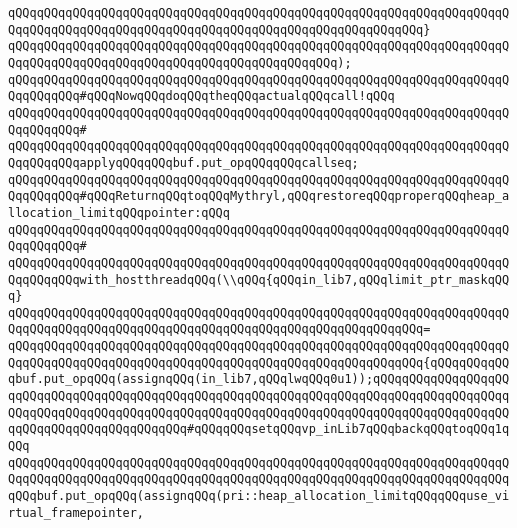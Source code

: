 \verb|qQQqqQQqqQQqqQQqqQQqqQQqqQQqqQQqqQQqqQQqqQQqqQQqqQQqqQQqqQQqqQQqqQQqqQQqqQQqqQQqqQQqqQQqqQQqqQQqqQQqqQQqqQQqqQQqqQQqqQQqqQQqqQQq}|\newline
\verb|qQQqqQQqqQQqqQQqqQQqqQQqqQQqqQQqqQQqqQQqqQQqqQQqqQQqqQQqqQQqqQQqqQQqqQQqqQQqqQQqqQQqqQQqqQQqqQQqqQQqqQQqqQQqqQQqqQQq);|\newline
\newline
\newline
\verb|qQQqqQQqqQQqqQQqqQQqqQQqqQQqqQQqqQQqqQQqqQQqqQQqqQQqqQQqqQQqqQQqqQQqqQQqqQQqqQQq#qQQqNowqQQqdoqQQqtheqQQqactualqQQqcall!qQQq|\newline
\verb|qQQqqQQqqQQqqQQqqQQqqQQqqQQqqQQqqQQqqQQqqQQqqQQqqQQqqQQqqQQqqQQqqQQqqQQqqQQqqQQq#|\newline
\verb|qQQqqQQqqQQqqQQqqQQqqQQqqQQqqQQqqQQqqQQqqQQqqQQqqQQqqQQqqQQqqQQqqQQqqQQqqQQqqQQqapplyqQQqqQQqbuf.put_opqQQqqQQqcallseq;|\newline
\newline
\newline
\verb|qQQqqQQqqQQqqQQqqQQqqQQqqQQqqQQqqQQqqQQqqQQqqQQqqQQqqQQqqQQqqQQqqQQqqQQqqQQqqQQq#qQQqReturnqQQqtoqQQqMythryl,qQQqrestoreqQQqproperqQQqheap_allocation_limitqQQqpointer:qQQq|\newline
\verb|qQQqqQQqqQQqqQQqqQQqqQQqqQQqqQQqqQQqqQQqqQQqqQQqqQQqqQQqqQQqqQQqqQQqqQQqqQQqqQQq#|\newline
\verb|qQQqqQQqqQQqqQQqqQQqqQQqqQQqqQQqqQQqqQQqqQQqqQQqqQQqqQQqqQQqqQQqqQQqqQQqqQQqqQQqwith_hostthreadqQQq(\\qQQq{qQQqin_lib7,qQQqlimit_ptr_maskqQQq}|\newline
\verb|qQQqqQQqqQQqqQQqqQQqqQQqqQQqqQQqqQQqqQQqqQQqqQQqqQQqqQQqqQQqqQQqqQQqqQQqqQQqqQQqqQQqqQQqqQQqqQQqqQQqqQQqqQQqqQQqqQQqqQQqqQQqqQQq=|\newline
\verb|qQQqqQQqqQQqqQQqqQQqqQQqqQQqqQQqqQQqqQQqqQQqqQQqqQQqqQQqqQQqqQQqqQQqqQQqqQQqqQQqqQQqqQQqqQQqqQQqqQQqqQQqqQQqqQQqqQQqqQQqqQQqqQQq{qQQqqQQqqQQqbuf.put_opqQQq(assignqQQq(in_lib7,qQQqlwqQQq0u1));qQQqqQQqqQQqqQQqqQQqqQQqqQQqqQQqqQQqqQQqqQQqqQQqqQQqqQQqqQQqqQQqqQQqqQQqqQQqqQQqqQQqqQQqqQQqqQQqqQQqqQQqqQQqqQQqqQQqqQQqqQQqqQQqqQQqqQQqqQQqqQQqqQQqqQQqqQQqqQQqqQQqqQQqqQQqqQQqqQQqqQQq#qQQqqQQqsetqQQqvp_inLib7qQQqbackqQQqtoqQQq1qQQq|\newline
\newline
\verb|qQQqqQQqqQQqqQQqqQQqqQQqqQQqqQQqqQQqqQQqqQQqqQQqqQQqqQQqqQQqqQQqqQQqqQQqqQQqqQQqqQQqqQQqqQQqqQQqqQQqqQQqqQQqqQQqqQQqqQQqqQQqqQQqqQQqqQQqqQQqqQQqbuf.put_opqQQq(assignqQQq(pri::heap_allocation_limitqQQqqQQquse_virtual_framepointer,|\newline
